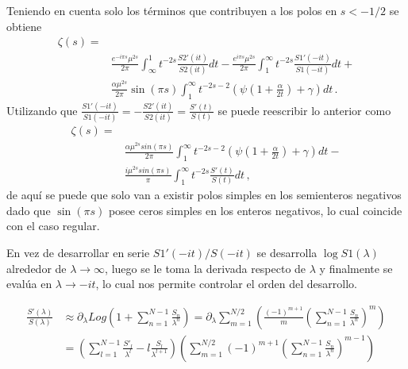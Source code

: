 Teniendo en cuenta solo los términos que contribuyen a los polos en  $s < -1/2$ se obtiene
\begin{equation}
\begin{aligned}
 \zeta  (s) =& \\[10pt]
& \frac{e ^{- i \pi s} \mu ^{2s } }{2 \pi}
\int _{\infty} ^{1} t ^{-2s } 
		\frac{S2' (it)}{S2 (it)}
		d t
	- 
\frac{e ^{i \pi s} \mu ^{2s}}{2 \pi}
\int _{1} ^{\infty} t ^{-2s } 
	\frac{S1' (-it)}{S1(-it)}
	d t +
	 \\[10pt]
	&  \frac{\alpha \mu ^{2s} }{2 \pi }	\sin ( \pi s)  \int _1 ^{\infty}
	t ^{-2s-2} \left( \psi \left( 1 + \frac{\alpha}{2 t}\right) + \gamma \right) dt 
		\, .
\end{aligned}
\end{equation}
Utilizando que  $\frac{S1' (-it)}{S1 (-i t)} = - \frac{S2 ' (i t)}{S2(it)} = \frac{S'(t)}{S(t)}  $ se puede reescribir lo anterior como
\begin{equation}
\begin{aligned}
\zeta  (s) =&  \\[5pt]
&
\frac{\alpha \mu ^{2s} sin( \pi s )}{2 \pi } \int _{1} ^{\infty} 
t ^{-2s-2} \left( \psi (1 + \frac{\alpha}{2 t}) + \gamma \right) dt -\\[5pt]
&   \frac{i \mu ^{2s}  sin (\pi s)}{\pi} \int _1 ^{\infty} t ^{-2s} \frac{S'(t)}{S(t)} dt 
	\, ,
\end{aligned}
\end{equation}
de aquí se puede que solo van a existir polos simples en los semienteros negativos dado que $\sin (\pi s)$ posee ceros simples en los enteros negativos, lo cual coincide con el caso regular.

En vez de desarrollar en serie $S1 '(-i t) / S (-i t)$ se desarrolla  $\log S1 (\lambda)$ alrededor de $\lambda \rightarrow \infty$, luego se le toma la derivada respecto de $\lambda$ y finalmente se evalúa en $\lambda \rightarrow -i t$, lo cual nos permite controlar el orden del desarrollo.

\begin{equation}
\begin{aligned}
\frac{S'( \lambda)}{S( \lambda )} &\approx 
\partial _{\lambda} Log \left(
								1 + \sum _{n=1} ^{N-1}  \frac{S _n}{\lambda ^n}
								\right) =
\partial _{\lambda} 
\sum _{m = 1} ^{N/2} 
	\left(
	\frac{(-1) ^{m+1} }{m}
	\left(
		\sum _{n=1} ^{N-1} \frac{S _n}{\lambda ^n}
		\right) ^m 
	\right)  \\[10pt]
	&=
\left(								
	\sum _{l = 1} ^{N-1} 
	\frac{S' _l}{\lambda ^l} - l \frac{S _l}{\lambda ^{l+1}}
	\right)							
\left(
	\sum _{m = 1} ^{N/2} (-1) ^{m+1} 
	\left(
			\sum _{n=1} ^{N-1} \frac{S _n}{\lambda ^n}
			\right) ^{m-1}		
	\right)
\end{aligned}	
\end{equation}



